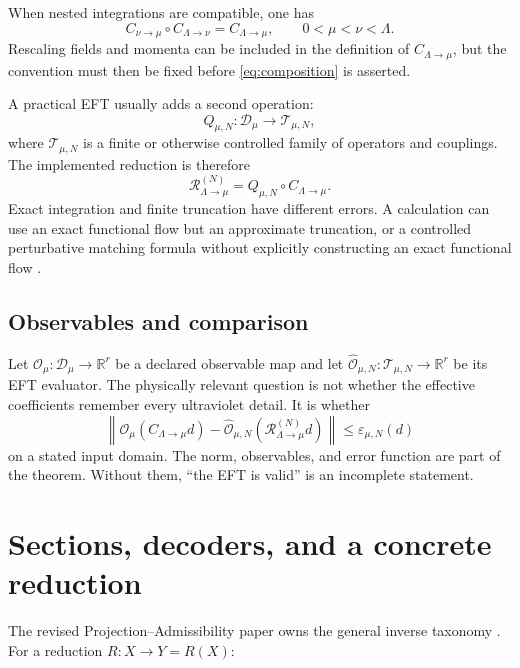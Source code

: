 \documentclass[11pt]{article}
\theoremstyle{definition}
\theoremstyle{remark}
\newcommand{\R}{\mathbb{R}}
\begin{document}
When nested integrations are compatible, one has
\begin{equation}
 C_{\nu\to\mu}\circ C_{\Lambda\to\nu}
 =
 C_{\Lambda\to\mu},
 \qquad
 0<\mu<\nu<\Lambda.
\label{eq:composition}
\end{equation}
Rescaling fields and momenta can be included in the definition of
\(C_{\Lambda\to\mu}\), but the convention must then be fixed before
\cref{eq:composition} is asserted.

A practical EFT usually adds a second operation:
\[
 Q_{\mu,N}:\mathcal D_\mu\longrightarrow\mathcal T_{\mu,N},
\]
where \(\mathcal T_{\mu,N}\) is a finite or otherwise controlled family of
operators and couplings.  The implemented reduction is therefore
\[
 \mathcal R_{\Lambda\to\mu}^{(N)}
 =
 Q_{\mu,N}\circ C_{\Lambda\to\mu}.
\]
Exact integration and finite truncation have different errors.  A calculation
can use an exact functional flow but an approximate truncation, or a
controlled perturbative matching formula without explicitly constructing an
exact functional flow \cite{Polchinski1984,Wetterich1993,Rosten2012}.

\subsection{Observables and comparison}

Let \(\mathcal O_\mu:\mathcal D_\mu\to\R^r\) be a declared observable map and
let
\(\widehat{\mathcal O}_{\mu,N}:\mathcal T_{\mu,N}\to\R^r\)
be its EFT evaluator.  The physically relevant question is not whether the
effective coefficients remember every ultraviolet detail.  It is whether
\begin{equation}
 \left\|
 \mathcal O_\mu(C_{\Lambda\to\mu}d)
 -
 \widehat{\mathcal O}_{\mu,N}
 (\mathcal R_{\Lambda\to\mu}^{(N)}d)
 \right\|
 \leq \varepsilon_{\mu,N}(d)
\label{eq:observable-error}
\end{equation}
on a stated input domain.  The norm, observables, and error function are part
of the theorem.  Without them, ``the EFT is valid'' is an incomplete
statement.

\section{Sections, decoders, and a concrete reduction}
\label{sec:inverse}

The revised Projection--Admissibility paper owns the general inverse
taxonomy \cite{NeroProjection}.  For a reduction \(R:X\to Y=R(X)\):
\end{document}
